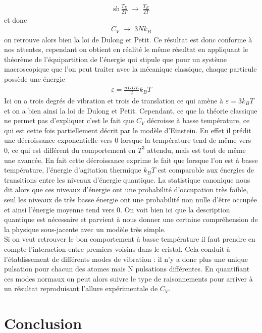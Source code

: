 \documentclass[12pt,prb,aps,epsf]{article}
\begin{document}
\begin{eqnarray}
\mathrm{sh}\,\frac{T_E}{2T} \;\longrightarrow \; \frac{T_E}{2T}
\end{eqnarray}
et donc  
\begin{eqnarray}
C_V \;\longrightarrow \; 3N k_B
\end{eqnarray}
on retrouve alors bien la loi de Dulong et Petit. Ce résultat est donc conforme à nos attentes, cependant on obtient en réalité le même résultat en appliquant le théorème de l'équipartition de l'énergie qui stipule que pour un système macroscopique que l'on peut traiter avec la mécanique classique, chaque particule possède une énergie 
\begin{eqnarray}
\varepsilon = \frac{nDDL}{2} k_B T
\end{eqnarray}
Ici on a trois degrés de vibration et trois de translation ce qui amène à $\varepsilon = 3k_BT$ et on a bien ainsi la loi de Dulong et Petit. Cependant, ce que la théorie classique ne permet pas d'expliquer c'est le fait que $C_V$ décroisse à basse température, ce qui est cette fois partiellement décrit par le modèle d'Einstein. En effet il prédit une décroissance exponentielle vers 0 lorsque la température tend de même vers 0, ce qui est différent du comportement en $T^3$ attendu, mais est tout de même une avancée. En fait cette décroissance exprime le fait que lorsque l'on est à basse température, l'énergie d'agitation thermique $k_BT$ est comparable aux énergies de transitions entre les niveaux d'énergie quantique. La statistique canonique nous dit alors que ces niveaux d'énergie ont une probabilité d'occupation très faible, seul les niveaux de très basse énergie ont une probabilité non nulle d'être occupée et ainsi l'énergie moyenne tend vers 0. On voit bien ici que la description quantique est nécessaire et parvient à nous donner une certaine compréhension de la physique sous-jacente avec un modèle très simple.\\

Si on veut retrouver le bon comportement à basse température il faut prendre en compte l'interaction entre premiers voisins dans le cristal. Cela conduit à l'établissement de différents modes de vibration : il n'y a donc plus une unique pulsation pour chacun des atomes mais N pulsations différentes. En quantifiant ces modes normaux on peut alors suivre le type de raisonnements pour arriver à un résultat reproduisant l'allure expérimentale de $C_V$.

\section{Conclusion}
\end{document}
